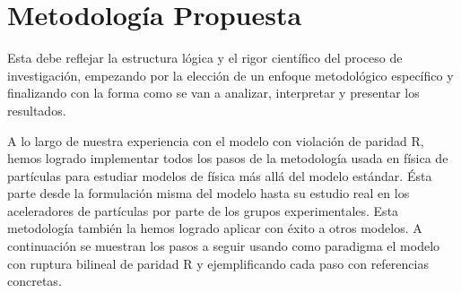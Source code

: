 \section{Metodología Propuesta}
\begin{instrucciones}
  Esta debe reflejar la estructura lógica y el rigor científico del
  proceso de investigación, empezando por la elección de un enfoque
  metodológico específico y finalizando con la forma como se van a
  analizar, interpretar y presentar los resultados.
\end{instrucciones}

A lo largo de nuestra experiencia con el modelo con violación de
paridad R, hemos logrado implementar todos los pasos de la metodología
usada en física de partículas para estudiar modelos de física más allá
del modelo estándar.  Ésta parte desde la formulación misma del modelo
hasta su estudio real en los aceleradores de partículas por parte de
los grupos experimentales. Esta metodología también la hemos logrado
aplicar con éxito a otros modelos. A continuación se muestran los
pasos a seguir usando como paradigma el modelo con ruptura bilineal de
paridad R y ejemplificando cada paso con referencias concretas.
